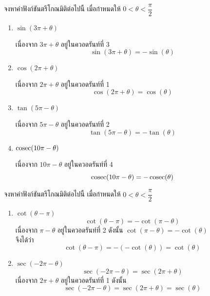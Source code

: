 \begin{examplebox}
จงหาค่าฟังก์ชันตรีโกณมิติต่อไปนี้ เมื่อกำหนดให้ $0<\theta<\dfrac{\pi}{2}$
\begin{enumerate}
    \item $\sin(3\pi+\theta)$  

    เนื่องจาก $3\pi+\theta$ อยู่ในควอดรันท์ที่ 3  
    \[
    \sin(3\pi+\theta)=-\sin(\theta)
    \]

    \item $\cos(2\pi+\theta)$  

    เนื่องจาก $2\pi+\theta$ อยู่ในควอดรันท์ที่ 1  
    \[
    \cos(2\pi+\theta)=\cos(\theta)
    \]

    \item $\tan(5\pi-\theta)$  

    เนื่องจาก $5\pi-\theta$ อยู่ในควอดรันท์ที่ 2  
    \[
    \tan(5\pi-\theta)=-\tan(\theta)
    \]
    
    \item $\operatorname{cosec}(10\pi-\theta)$  

    เนื่องจาก $10\pi-\theta$ อยู่ในควอดรันท์ที่ 4  
    \[
    \operatorname{cosec}(10\pi-\theta)=-\operatorname{cosec}(\theta)
    \]
\end{enumerate}
\end{examplebox}

\begin{examplebox}
จงหาค่าฟังก์ชันตรีโกณมิติต่อไปนี้ เมื่อกำหนดให้ $0<\theta<\dfrac{\pi}{2}$
\begin{enumerate}
    \item $\cot(\theta-\pi)$  
   \[
    \cot(\theta-\pi)
    =-\cot(\pi-\theta)
    \]
เนื่องจาก $\pi-\theta$ อยู่ในควอดรันท์ที่ 2 ดังนั้น $\cot(\pi-\theta)=-\cot(\theta)$\\
จึงได้ว่า
  \[
    \cot(\theta-\pi)
    =-(-\cot(\theta))
    =\cot(\theta)
    \]
    \item $\sec(-2\pi-\theta)$  
    \[
    \sec(-2\pi-\theta)
    =\sec(2\pi+\theta)
    \]
เนื่องจาก $2\pi+\theta$ อยู่ในควอดรันท์ที่ 1 ดังนั้น    
    \[
    \sec(-2\pi-\theta)
    =\sec(2\pi+\theta)
    =\sec(\theta)
    \]
\end{enumerate}
\end{examplebox}

